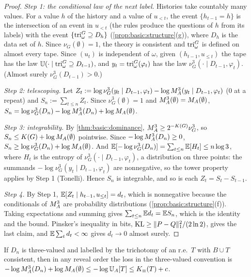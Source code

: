 \begin{proof}
\emph{Step 1: the conditional law of the next label.} Histories take countably many values. For a value $h$ of the history and a value of $u_{<t}$, the event $\{h_{t-1}=h\}$ is the intersection of an event in $u_{<t}$ (the rules produce the questions of $h$ from its labels) with the event $\{\mathrm{tri}^G_\omega\supseteq D_h\}$ (\cref{prop:basic:structure}(g)), where $D_h$ is the data set of $h$. Since $\nu_G(\emptyset)=1$, the theory is consistent and $\mathrm{tri}^G_\omega$ is defined on almost every tape. Since $(u_t)$ is independent of $\omega$, given $(h_{t-1},u_{\le t})$ the tape has the law $\mathbb{U}(\cdot\mid\mathrm{tri}^G_\omega\supseteq D_{t-1})$, and $y_t=\mathrm{tri}^G_\omega(\varphi_t)$ has the law $\nu^3_G(\cdot\mid D_{t-1},\varphi_t)$. (Almost surely $\nu^3_G(D_{t-1})>0$.)

\emph{Step 2: telescoping.} Let $Z_t:=\log\nu^3_G(y_t\mid D_{t-1},\varphi_t)-\log M_{A}^{3}(y_t\mid D_{t-1},\varphi_t)$ ($0$ at a repeat) and $S_n:=\sum_{t\le n}Z_t$. Since $\nu^3_G(\emptyset)=1$ and $M_{A}^{3}(\emptyset)=M_{A}(\emptyset)$, $S_n=\log\nu^3_G(D_n)-\log M_{A}^{3}(D_n)+\log M_{A}(\emptyset)$.

\emph{Step 3: integrability.} By \cref{thm:basic:dominance}, $M_{A}^{3}\ge2^{-K(G)}\nu^3_G$, so $S_n\le K(G)+\log M_{A}(\emptyset)$ pointwise. Since $-\log M_{A}^{3}(D_n)\ge0$, $S_n\ge\log\nu^3_G(D_n)+\log M_{A}(\emptyset)$. And $\mathbb{E}[-\log\nu^3_G(D_n)]=\sum_{t\le n}\mathbb{E}[H_t]\le n\log3$, where $H_t$ is the entropy of $\nu^3_G(\cdot\mid D_{t-1},\varphi_t)$, a distribution on three points: the summands $-\log\nu^3_G(y_t\mid D_{t-1},\varphi_t)$ are nonnegative, so the tower property applies by Step 1 (Tonelli). Hence $S_n$ is integrable, and so is each $Z_t=S_t-S_{t-1}$.

\emph{Step 4.} By Step 1, $\mathbb{E}[Z_t\mid h_{t-1},u_{\le t}]=d_t$, which is nonnegative because the conditionals of $M_{A}^{3}$ are probability distributions (\cref{prop:basic:structure}(f)). Taking expectations and summing gives $\sum_{t\le n}\mathbb{E} d_t=\mathbb{E} S_n$, which is the identity and the bound. Pinsker's inequality in bits, $\operatorname{KL}\ge\lVert P-Q\rVert_1^2/(2\ln2)$, gives the last claim, and $\mathbb{E}\sum_td_t<\infty$ gives $d_t\to0$ almost surely.
\end{proof}

\begin{corollary}\label{cor:basic:threeloss}
If $D_n$ is three-valued and labelled by the trichotomy of an r.e.\ $T$ with $B\cup T$ consistent, then in any reveal order the loss in the three-valued convention is $-\log M_{A}^{3}(D_n)+\log M_{A}(\emptyset)\le-\log\mathbb{U}_{A}[T]\le K_{\equiv}(T)+c$.
\end{corollary}

